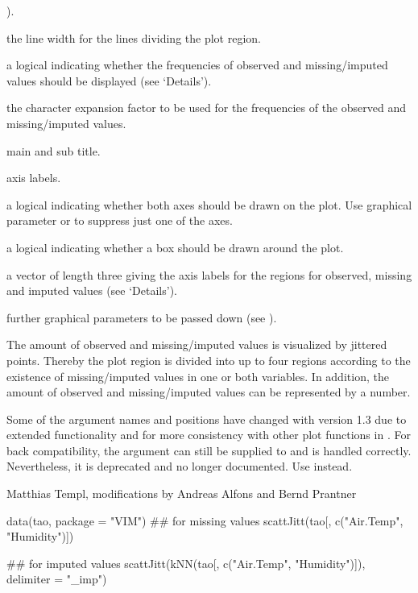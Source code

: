 \begin{Arguments}
\begin{ldescription}
).
\item[\code{lwd}] the line width for the lines dividing the plot region.
\item[\code{numbers}] a logical indicating whether the frequencies of 
observed and missing/imputed values should be displayed
(see `Details').
\item[\code{cex.numbers}] the character expansion factor to be used for the 
frequencies of the observed and missing/imputed values.
\item[\code{main, sub}] main and sub title.
\item[\code{xlab, ylab}] axis labels.
\item[\code{axes}] a logical indicating whether both axes should be drawn 
on the plot.  Use graphical parameter  or  
to suppress just one of the axes.
\item[\code{frame.plot}] a logical indicating whether a box should be drawn 
around the plot.
\item[\code{labels}] a vector of length three giving the axis labels for the 
regions for observed, missing and imputed values (see `Details').
\item[\code{...}] further graphical parameters to be passed down (see 
).
\end{ldescription}
\end{Arguments}
%
\begin{Details}\relax
The amount of observed and missing/imputed values is visualized by jittered points.  
Thereby the plot region is divided into up to four regions according to 
the existence of missing/imputed values in one or both variables.  In addition, 
the amount of observed and missing/imputed values can be represented by a number.
\end{Details}
%
\begin{Note}\relax
Some of the argument names and positions have changed with version 1.3 
due to extended functionality and for more consistency with other plot 
functions in .  For back compatibility, the argument 
 can still be supplied to  and is handled 
correctly.  Nevertheless, it is deprecated and no longer documented.  
Use  instead.
\end{Note}
%
\begin{Author}\relax
Matthias Templ, modifications by Andreas Alfons and Bernd Prantner
\end{Author}
%
\begin{Examples}
\begin{ExampleCode}
data(tao, package = "VIM")
## for missing values
scattJitt(tao[, c("Air.Temp", "Humidity")])

## for imputed values
scattJitt(kNN(tao[, c("Air.Temp", "Humidity")]), delimiter = "_imp")
\end{ExampleCode}
\end{Examples}
